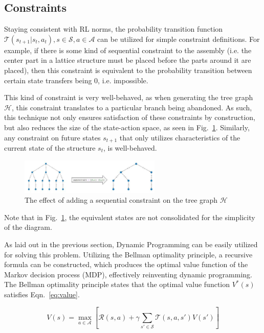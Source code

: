 \documentclass{article}
\begin{document}
\subsection{Constraints}
Staying consistent with RL norms, the probability transition function $\mathcal{T}(s_{t+1}|s_t,a_t), s\in\mathcal{S}, a\in\mathcal{A}$ can be utilized for simple constraint definitions. For example, if there is some kind of sequential constraint to the assembly (i.e. the center part in a lattice structure must be placed before the parts around it are placed), then this constraint is equivalent to the probability transition between certain state transfers being 0, i.e. impossible.

This kind of constraint is very well-behaved, as when generating the tree graph $\mathcal{H}$, this constraint translates to a particular branch being abandoned. As such, this technique not only ensures satisfaction of these constraints by construction, but also reduces the size of the state-action space, as seen in Fig.~\ref{fig:cnstrnt}. Similarly, any constraint on future states $s_{t+1}$ that only utilizes characteristics of the current state of the structure $s_t$, is well-behaved.

\begin{figure}[!htb]
    \centering
    \includegraphics[width=0.6\textwidth]{figs/Constraint.jpg}
      \caption{The effect of adding a sequential constraint on the tree graph $\mathcal{H}$}
      \label{fig:cnstrnt}
\end{figure}

Note that in Fig.~\ref{fig:cnstrnt}, the equivalent states are not consolidated for the simplicity of the diagram.

As laid out in the previous section, Dynamic Programming can be easily utilized for solving this problem. Utilizing the Bellman optimality principle, a recursive formula can be constructed, which produces the optimal value function of the Markov decision process (MDP), effectively reinventing dynamic programming. The Bellman optimality principle states that the optimal value function $V^*(s)$ satisfies Eqn.~\ref{eq:value}.

\begin{equation} \label{eq:value}
    V(s) = \max_{a \in \mathcal{A}} \left[\mathcal{R}(s,a) + \gamma \sum_{s' \in \mathcal{S}} \mathcal{T}(s,a,s') V(s')\right]    
\end{equation}
\end{document}
